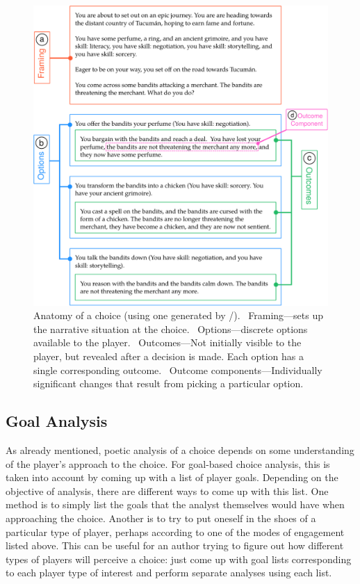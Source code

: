 \begin{figure}[!p]
\centering
\includegraphics[width=\textwidth]{fig/choice-anatomy-crop.pdf}
\caption[Anatomy of a choice]{%
\addtolength{\baselineskip}{0pt plus 1pt minus 1pt}
Anatomy of a choice (using one generated by \dunyazad/).
%
~Framing---sets up the narrative situation at the choice.
%
~Options---discrete options available to the player.
%
~Outcomes---Not initially visible to the player, but revealed after a decision is made.
%
Each option has a single corresponding outcome.
%
~Outcome components---Individually significant changes that result from picking a particular option.}
\label{fig:choice-anatomy}
\end{figure}


\subsection{Goal Analysis}

\label{sec:cp-goal-analysis}

As already mentioned, poetic analysis of a choice depends on some understanding of the player's approach to the choice.
%
For goal-based choice analysis, this is taken into account by coming up with a list of player goals.
%
Depending on the objective of analysis, there are different ways to come up with this list.
%
One method is to simply list the goals that the analyst themselves would have when approaching the choice.
%
Another is to try to put oneself in the shoes of a particular type of player, perhaps according to one of the modes of engagement listed above.
%
This can be useful for an author trying to figure out how different types of players will perceive a choice: just come up with goal lists corresponding to each player type of interest and perform separate analyses using each list.


